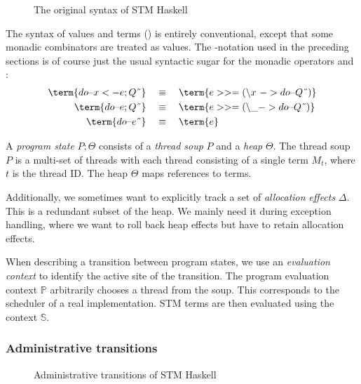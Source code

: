 \begin{figure}

\caption{The original syntax of STM Haskell\\ \parencite{harris-et-al-2005}}
\label{fig:orig-syntax}
\end{figure}

The syntax of values and terms () is entirely conventional, except that some monadic combinators are treated as values.
%
The -notation used in the preceding sections is of course just the usual syntactic sugar for the monadic operators \term{>>=} and :
\begin{align*}
\term{do \string{ x <- e; Q \string}} & \quad\equiv\quad \term{e >>= (\string\x \ -> do \string{ Q \string})}\\
\term{do \string{ e; Q \string}} & \quad\equiv\quad \term{e >>= (\string\_ -> do \string{ Q \string})}\\
\term{do \string{ e \string}} & \quad\equiv\quad \term{e}
\end{align*}

A \emph{program state} $P;\Theta$ consists of a \emph{thread soup} $P$ and a \emph{heap} $\Theta$.
The thread soup $P$ is a multi-set of threads with each thread consisting of a single term $M_t$, where $t$ is the thread ID.
The heap $\Theta$ maps references to terms.

Additionally, we sometimes want to explicitly track a set of \emph{allocation effects} $\Delta$.
This is a redundant subset of the heap.
We mainly need it during exception handling, where we want to roll back heap effects but have to retain allocation effects.

When describing a transition between program states, we use an \emph{evaluation context} to identify the active site of the transition.
The program evaluation context $\mathbb{P}$ arbitrarily chooses a thread from the soup.
This corresponds to the scheduler of a real implementation.
STM terms are then evaluated using the context $\mathbb{S}$.

\subsubsection{Administrative transitions}

\begin{figure}

\caption{Administrative transitions of STM Haskell\\ \parencite{harris-et-al-2005}}
\label{fig:orig-admin}
\end{figure}

